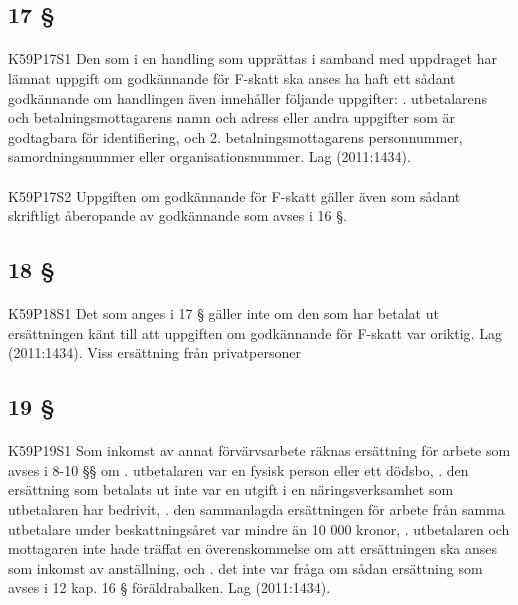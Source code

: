 \documentclass[a4paper,notitlepage,openany,10pt]{book}
\begin{document}
\subsection*{17 §}
\paragraph*{}
{\tiny K59P17S1}
Den som i en handling som upprättas i samband med uppdraget har lämnat uppgift om godkännande för F-skatt ska anses ha haft ett sådant godkännande om handlingen även innehåller följande uppgifter:
. utbetalarens och betalningsmottagarens namn och adress eller andra uppgifter som är godtagbara för identifiering, och 2. betalningsmottagarens personnummer, samordningsnummer eller organisationsnummer.
Lag (2011:1434).
\paragraph*{}
{\tiny K59P17S2}
Uppgiften om godkännande för F-skatt gäller även som sådant skriftligt åberopande av godkännande som avses i 16 §.
\subsection*{18 §}
\paragraph*{}
{\tiny K59P18S1}
Det som anges i 17 § gäller inte om den som har betalat ut ersättningen känt till att uppgiften om godkännande för F-skatt var oriktig.
Lag (2011:1434).
Viss ersättning från privatpersoner
\subsection*{19 §}
\paragraph*{}
{\tiny K59P19S1}
Som inkomst av annat förvärvsarbete räknas ersättning för arbete som avses i 8-10 §§ om
. utbetalaren var en fysisk person eller ett dödsbo,
. den ersättning som betalats ut inte var en utgift i en näringsverksamhet som utbetalaren har bedrivit,
. den sammanlagda ersättningen för arbete från samma utbetalare under beskattningsåret var mindre än 10 000 kronor,
. utbetalaren och mottagaren inte hade träffat en överenskommelse om att ersättningen ska anses som inkomst av anställning, och
. det inte var fråga om sådan ersättning som avses i 12 kap. 16 § föräldrabalken.
Lag (2011:1434).
\end{document}
